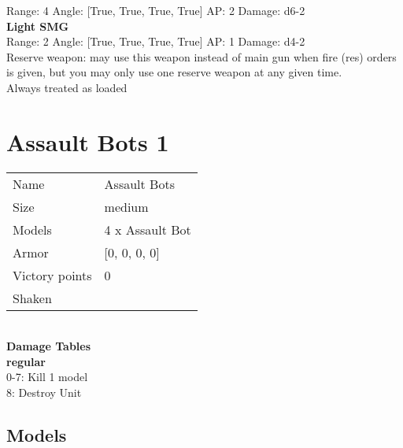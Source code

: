 Range: 4  Angle: [True, True, True, True] AP: 2 Damage: d6-2 \\




{\bf Light SMG } \\



Range: 2  Angle: [True, True, True, True] AP: 1 Damage: d4-2 \\
Reserve weapon: may use this weapon instead of main gun when fire (res) orders is given, but you may only use one reserve weapon at any given time.\\ 
Always treated as loaded\\ 




 















\clearpage

\section{ Assault Bots 1 }

\begin{tabular}{ll}
  Name & Assault Bots \\
  Size & medium\\
  Models & 4 x Assault Bot\\
  Armor & [0, 0, 0, 0]\\
  Victory points & 0\\
  Shaken & \\
\end{tabular}

\\ 



{\bf Damage Tables} \\
 {\bf regular } \\
0-7: Kill 1 model \\
8: Destroy Unit \\


\clearpage

\subsection{ Models }

